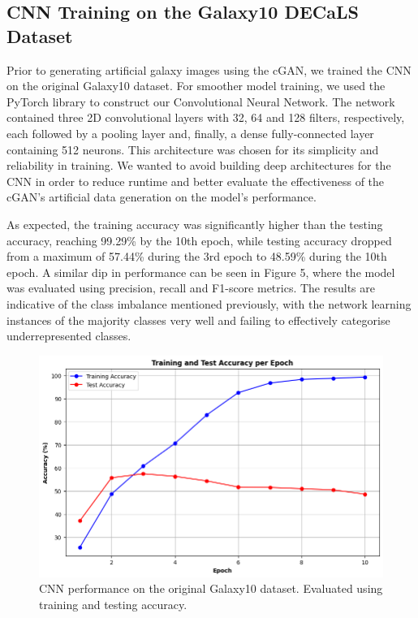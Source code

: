 \documentclass[10pt,twocolumn,letterpaper]{article}
\begin{document}
\subsection{CNN Training on the Galaxy10 DECaLS Dataset}
Prior to generating artificial galaxy images using the cGAN, we trained the CNN on the original Galaxy10 dataset.
For smoother model training, we used the PyTorch library to construct our Convolutional Neural Network.
The network contained three 2D convolutional layers with 32, 64 and 128 filters, respectively, each followed by a pooling layer and, finally, a dense fully-connected layer containing 512 neurons.
This architecture was chosen for its simplicity and reliability in training. 
We wanted to avoid building deep architectures for the CNN in order to reduce runtime and better evaluate the effectiveness of the cGAN's artificial data generation on the model's performance. 


As expected, the training accuracy was significantly higher than the testing accuracy, reaching 99.29\% by the 10th epoch, while testing accuracy dropped from a maximum of 57.44\% during the 3rd epoch to 48.59\% during the 10th epoch.
A similar dip in performance can be seen in Figure 5, where the model was evaluated using precision, recall and F1-score metrics. 
The results are indicative of the class imbalance mentioned previously, with the network learning instances of the majority classes very well and failing to effectively categorise underrepresented classes. 
\begin{figure}[htbp]
    \includegraphics[width=\linewidth]{initial_cnn_acc.png}
    \caption{CNN performance on the original Galaxy10 dataset. Evaluated using training and testing accuracy.}
    \label{fig:initialcnnacc}
  \end{figure}
\end{document}
